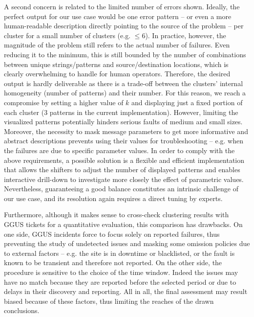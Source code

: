 A second concern is related to the limited number of errors shown.
Ideally, the perfect output for our use case would be one error pattern
-- or even a more human-readable description directly pointing to the source of the problem -- 
per cluster for a small number of clusters (e.g. $\leq6$).
In practice, however, the magnitude of the problem still refers to the actual number of failures. Even reducing it to the minimum, this is still bounded by the number of combinations between unique strings/patterns and source/destination locations, which is clearly overwhelming to handle for human operators.
Therefore, the desired output is hardly deliverable as there is a trade-off between the clusters' internal homogeneity (number of patterns) and their number.
For this reason, we reach a compromise by setting a higher value of $k$ and displaying just a fixed portion of each cluster (3 patterns in the current implementation).
However, limiting the visualized patterns potentially hinders serious faults of medium and small sizes.
Moreover, the necessity to mask message parameters to get more informative and abstract descriptions prevents using their values for troubleshooting -- e.g. when the failures are due to specific parameter values.
In order to comply with the above requirements, a possible solution is a flexible and efficient implementation that allows the shifters to adjust the number of displayed patterns and enables interactive drill-down to investigate more closely the effect of parametric values.
Nevertheless, guaranteeing a good balance constitutes an intrinsic challenge of our use case, and its resolution again requires a direct tuning by experts.

Furthermore, although it makes sense to cross-check clustering results with GGUS tickets for a quantitative evaluation, this comparison has drawbacks. 
On one side, GGUS incidents force to focus solely on reported failures, thus preventing the study of undetected issues and masking some omission policies due to external factors -- e.g. the site is in downtime or blacklisted, or the fault is known to be transient and therefore not reported.
On the other side, the procedure is sensitive to the choice of the time window.
Indeed the issues may have no match because they are reported before the selected period or due to delays in their discovery and reporting. 
All in all, the final assessment may result biased because of these factors, thus limiting the reaches of the drawn conclusions.

